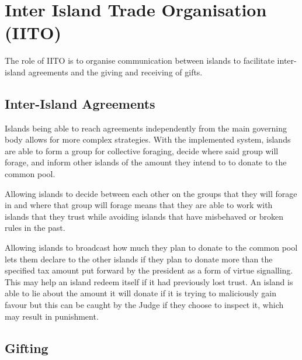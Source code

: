 \chapter{Inter Island Trade Organisation (IITO)}

The role of IITO is to organise communication between islands to facilitate inter-island agreements and the giving and receiving of gifts.  

\section{Inter-Island Agreements}  
\label{sec:IITO:inter_island_agreements}  


Islands being able to reach agreements independently from the main governing body allows for more complex strategies. With the implemented system, islands are able to form a group for collective foraging, decide where said group will forage, and inform other islands of the amount they intend to to donate to the common pool.  

Allowing islands to decide between each other on the groups that they will forage in and where that group will forage means that they are able to work with islands that they trust while avoiding islands that have misbehaved or broken rules in the past.


Allowing islands to broadcast how much they plan to donate to the common pool lets them declare to the other islands if they plan to donate more than the specified tax amount put forward by the president as a form of virtue signalling. This may help an island redeem itself if it had previously lost trust. An island is able to lie about the amount it will donate if it is trying to maliciously gain favour but this can be caught by the Judge if they choose to inspect it, which may result in punishment.

\section{Gifting}  
\label{sec:IITO:gifting}  

